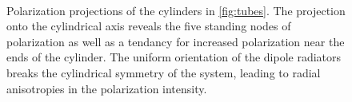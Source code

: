 \begin{figure}
  \centering
   \\
  \caption{\label{fig:tube projection}
    Polarization projections of the cylinders in \cref{fig:tubes}.
    The projection onto the cylindrical axis reveals the five standing nodes of polarization as well as a tendancy for increased polarization near the ends of the cylinder.
    The uniform orientation of the dipole radiators breaks the cylindrical symmetry of the system, leading to radial anisotropies in the polarization intensity.
  }
\end{figure}
